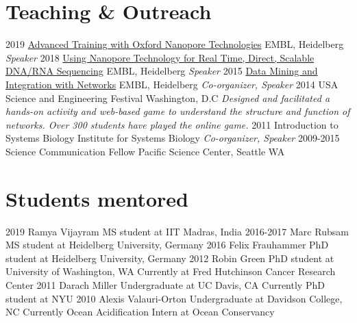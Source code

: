 \documentclass[usenames,dvipsnames]{friggeri-cv}
\begin{document}
\section{Teaching \& Outreach}
\begin{entrylist}
    \entry
    {2019}
    {\href{https://www.embl.de/training/events/2019/NAN19-01/programme/index.html}{Advanced Training with Oxford Nanopore Technologies}}
    {EMBL, Heidelberg}
    {\emph{Speaker}}
     \entry
    {2018}
    {\href{https://www.embl.de/training/events/2018/NAN18-01/}{Using Nanopore Technology for Real Time, Direct, Scalable DNA/RNA Sequencing}}
    {EMBL, Heidelberg}
    {\emph{Speaker}}
    \entry
    {2015}
    {\href{http://scalefreegan.github.io/Teaching/DataIntegration/}{Data Mining and Integration with Networks}}
    {EMBL, Heidelberg}
    {\emph{Co-organizer, Speaker}}
  \entry
    {2014}
    {USA Science and Engineering Festival}
    {Washington, D.C}
    {\emph{Designed and facilitated a hands-on activity and web-based game to understand the structure and function of networks. Over 300 students have played the online game.}}
  \entry
    {2011}
    {Introduction to Systems Biology}
    {Institute for Systems Biology}
    {\emph{Co-organizer, Speaker}}
    \entry
    {2009-2015}
    {Science Communication Fellow}
    {Pacific Science Center, Seattle WA}
    {}
\end{entrylist}

\section{Students mentored}
\begin{entrylist}
  \entry
    {2019}
    {Ramya Vijayram}
    {MS student at IIT Madras, India}
    {}
   \entry
    {2016-2017}
    {Marc Rubsam}
    {MS student at Heidelberg University, Germany}
    {}
  \entry
    {2016}
    {Felix Frauhammer}
    {PhD student at Heidelberg University, Germany}
    {}
  \entry
    {2012}
    {Robin Green}
    {PhD student at University of Washington, WA}
    {Currently at Fred Hutchinson Cancer Research Center}
  \entry
    {2011}
    {Darach Miller}
    {Undergraduate at UC Davis, CA}
    {Currently PhD student at NYU}
  \entry
    {2010}
    {Alexis Valauri-Orton}
    {Undergraduate at Davidson College, NC}
    {Currently Ocean Acidification Intern at Ocean Conservancy}
\end{entrylist}
\end{document}
